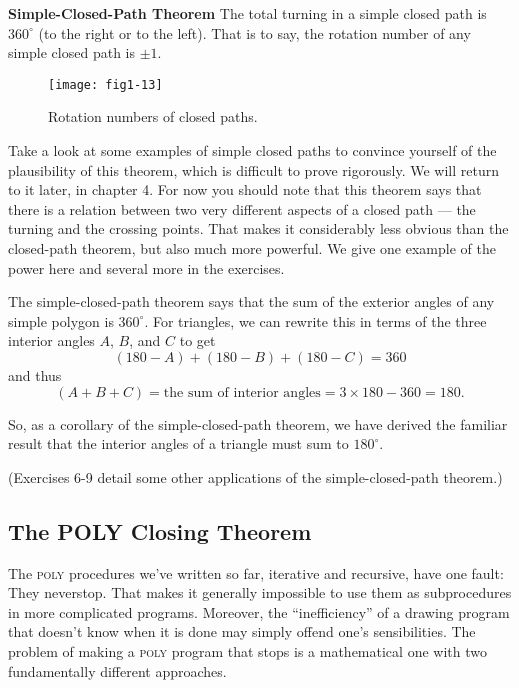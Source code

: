 \documentclass{book}
\begin{document}
\noindent \textbf{Simple-Closed-Path Theorem} The total turning in a simple closed path
is $360^{\circ}$ (to the right or to the left). That is to say, the rotation number
of any simple closed path is $\pm 1$.

\vspace{0.5cm}

\begin{figure}
\begin{center}
\texttt{[image: fig1-13]}
\caption{Rotation numbers of closed paths.}
\end{center}
\end{figure}

Take a look at some examples of simple closed paths to convince
yourself of the plausibility of this theorem, which is difficult to prove
rigorously. We will return to it later, in chapter 4. For now you should
note that this theorem says that there is a relation between two very
different aspects of a closed path --- the turning and the crossing points.
That makes it considerably less obvious than the closed-path theorem,
but also much more powerful. We give one example of the power here
and several more in the exercises.

The simple-closed-path theorem says that the sum of the exterior
angles of any simple polygon is $360^{\circ}$. For triangles, we can rewrite this
in terms of the three interior angles $A$, $B$, and $C$ to get
$$(180 - A) + (180 - B) + (180 - C) = 360$$
\noindent and thus
$$(A + B + C) = \text{the sum of interior angles} = 3 \times 180 - 360 = 180.$$

So, as a corollary of the simple-closed-path theorem, we have derived the
familiar result that the interior angles of a triangle must sum to $180^{\circ}$.

(Exercises 6-9 detail some other applications of the simple-closed-path
theorem.)

\subsection{The POLY Closing Theorem}

The \textsc{poly} procedures we've written so far, iterative and recursive, have
one fault: They neverstop. That makes it generally impossible to
use them as subprocedures in more complicated programs. Moreover,
the ``inefficiency'' of a drawing program that doesn't know when it is
done may simply offend one's sensibilities. The problem of making a
\textsc{poly} program that stops is a mathematical one with two fundamentally
different approaches.
\end{document}
